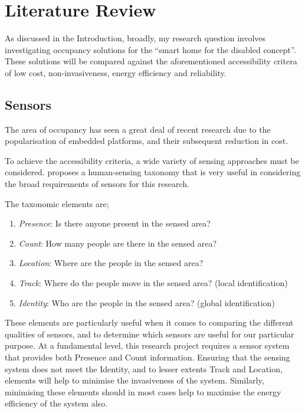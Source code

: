 \documentclass[../thesis/thesis.tex]{subfiles}
\begin{document}
\chapter{Literature Review}
 
As discussed in the Introduction, broadly, my research question involves investigating occupancy solutions for the ``smart home for the disabled concept''. These solutions will be compared against the aforementioned accessibility critera of low cost, non-invasiveness, energy efficiency and reliability.

\section{Sensors}

The area of occupancy has seen a great deal of recent research due to the popularisation of embedded platforms, and their subsequent reduction in cost. 

To achieve the accessibility criteria, a wide variety of sensing approaches must be considered. \cite{teixeira2010survey} proposes a human-sensing taxonomy that is very useful in considering the broad requirements of sensors for this research.

The taxonomic elements are;
\begin{enumerate}
 \item \emph{Presence}: Is there anyone present in the sensed area?
 \item \emph{Count}: How many people are there in the sensed area?
 \item \emph{Location}: Where are the people in the sensed area?
 \item \emph{Track}: Where do the people move in the sensed area? (local identification)
 \item \emph{Identity}: Who are the people in the sensed area? (global identification)
\end{enumerate}

These elements are particularly useful when it comes to comparing the different qualities of sensors, and to determine which sensors are useful for our particular purpose. At a fundamental level, this research project requires a sensor system that provides both Presence and Count information. Ensuring that the sensing system does not meet the Identity, and to lesser extents Track and Location, elements will help to minimise the invasiveness of the system. Similarly, minimising these elements should in most cases help to maximise the energy efficiency of the system also.
\end{document}
